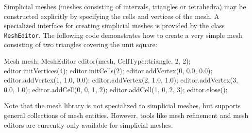 Simplicial meshes (meshes consisting of intervals, triangles or
tetrahedra) may be constructed explicitly by specifying the
cells and vertices of the mesh. A specialized interface for creating
simplicial meshes is provided by the class \texttt{MeshEditor}.
The following code demonstrates how to create a very simple mesh
consisting of two triangles covering the unit square:
\begin{code}
Mesh mesh;
MeshEditor editor(mesh, CellType::triangle, 2, 2);
editor.initVertices(4);
editor.initCells(2);
editor.addVertex(0, 0.0, 0.0);
editor.addVertex(1, 1.0, 0.0);
editor.addVertex(2, 1.0, 1.0);
editor.addVertex(3, 0.0, 1.0);
editor.addCell(0, 0, 1, 2);
editor.addCell(1, 0, 2, 3);
editor.close();
\end{code}
Note that the \dolfin{} mesh library is not specialized to simplicial
meshes, but supports general collections of mesh entities. However,
tools like mesh refinement and mesh editors are currently only
available for simplicial meshes.
